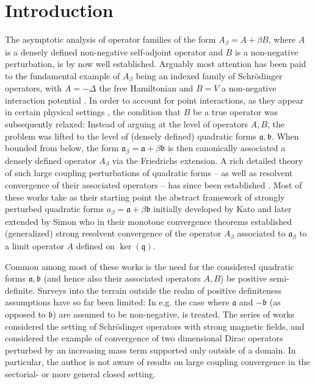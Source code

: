 \documentclass[reqno,12pt,letterpaper]{amsart}
\numberwithin{equation}{section}
\newcommand{\1}{\mathds{1}}
\theoremstyle{definition}
\begin{document}
	\section{Introduction}
	The asymptotic analysis of operator families of the form \( A_\beta = A + \beta B \), where \( A \) is a densely defined non-negative self-adjoint operator and \( B \) is a non-negative perturbation, is by now well established. Arguably most attention has been paid to the fundamental example  of $A_\beta$  being an indexed family of Schrödinger operators, with $A=-\Delta$ the free Hamiltonian and $B=V$ a non-negative interaction potential \cite{demuth1991large, demuth1995schrodinger, demuth1993rate, bruneau2002spectral}. 
	In order to account for point interactions, as they appear in certain physical settings \cite{albeverio2004solvable}, the condition that $B$ be a true operator was subsequently relaxed: Instead of arguing at the level of operators $A, B$, the problem was lifted to the level of (densely defined) quadratic forms $\mathfrak{a}, \mathfrak{b} $. When bounded from below, the form $\mathfrak{a}_{\beta} = \mathfrak{a} +  \beta \mathfrak{b}$ is then canonically associated a densely defined operator $A_\beta$ via the Friedrichs extension. A rich detailed theory of such large coupling perturbations of quadratic forms -- as well as resolvent convergence of their associated operators -- has since been established \cite{fukushima1994dirichlet, stollmann1994stoerungstheorie, brasche2001upper, brasche2005dynkin,  brasche2005resolvent, benamor2008sharp, benamor2007sobolev, belhadjali2011large}. Most of these works take as their starting point the  abstract framework of strongly perturbed quadratic forms $a_\beta = \mathfrak{a} + \beta \mathfrak{b} $ initially developed by Kato  \cite{kato1995perturbation} and later extended by Simon \cite{simon1978canonical} who in their monotone convergence theorems established (generalized) strong resolvent convergence of the operator $A_\beta$ associated to $\mathfrak{a}_\beta$ to a limit operator $\underline{A}$ defined on $\ker(\mathfrak{q})$.
	
	\medskip
	
	 Common among most of these works is the need for the considered quadratic forms $\mathfrak{a}, \mathfrak{b}$ (and hence also their associated operators $A,B$) be positive semi-definite. Surveys into the terrain outside the realm of positive definiteness assumptions have so far been limited: In \cite{belhadjali2023large} e.g. the case where $\mathfrak{a}$ and $-\mathfrak{b}$ (as opposed to $\mathfrak{b}$) are assumed to be non-negative, is treated. The series of works \cite{hempel1995strong, hempel2003magnetic,hempel2006schrodinger} considered the setting of Schrödinger operators with strong magnetic fields, and \cite{barbaroux2019resolvent, Duran2024} considered the example of convergence of two dimensional Dirac operators perturbed by an increasing mass term supported only outside of a domain. In particular, the author is not aware of results on large coupling convergence in the sectorial- or more general closed setting.
\end{document}
